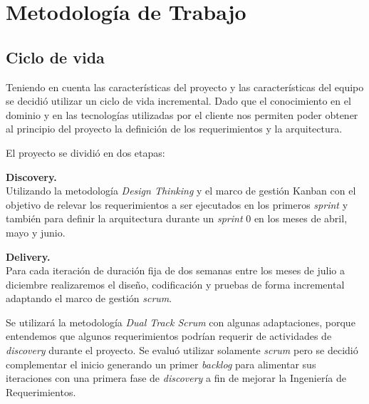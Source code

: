 \section{Metodología de Trabajo}\label{sec:metodologiaDeTrabajo}

\subsection{Ciclo de vida} 

Teniendo en cuenta las características del proyecto y las características del equipo se decidió utilizar un ciclo de vida 
incremental.  Dado que el conocimiento en el dominio y en las tecnologías utilizadas por el cliente nos permiten poder obtener 
al principio del proyecto la definición de los requerimientos y la arquitectura.

El proyecto se dividió en dos etapas:

\textbf{Discovery.}\\
Utilizando la metodología \textit{Design Thinking} y el marco de gestión Kanban con el objetivo de relevar los requerimientos a ser ejecutados 
en los primeros \textit{sprint} y también para definir la arquitectura durante un \textit{sprint} 0 en los meses de abril, mayo y junio. 

\textbf{Delivery.}\\
Para cada iteración de duración fija de dos semanas entre los meses de julio a diciembre realizaremos el diseño, codificación y pruebas de forma 
incremental adaptando el marco de gestión \textit{scrum}.

Se utilizará la metodología \textit{Dual Track Scrum} con algunas adaptaciones, porque entendemos que algunos requerimientos podrían requerir de actividades 
de \textit{discovery} durante el proyecto. Se evaluó utilizar solamente \textit{scrum} pero se decidió complementar el inicio generando un primer \textit{backlog} para 
alimentar sus iteraciones con una primera fase de \textit{discovery} a fin de mejorar la Ingeniería de Requerimientos.


